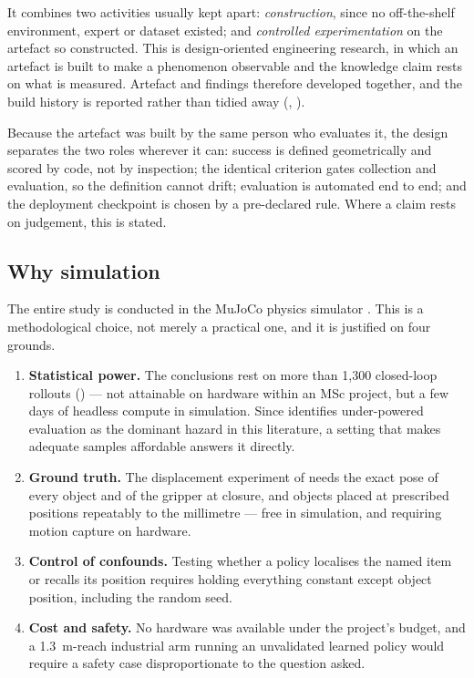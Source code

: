 It combines two activities usually kept apart: \emph{construction}, since no
off-the-shelf environment, expert or dataset existed; and \emph{controlled
experimentation} on the artefact so constructed. This is design-oriented engineering
research, in which an artefact is built to make a phenomenon observable and the
knowledge claim rests on what is measured. Artefact and findings therefore developed
together, and the build history is reported rather than tidied away
(, ).

Because the artefact was built by the same person who evaluates it, the design separates
the two roles wherever it can: success is defined geometrically and scored by code, not
by inspection; the identical criterion gates collection and evaluation, so the
definition cannot drift; evaluation is automated end to end; and the deployment
checkpoint is chosen by a pre-declared rule. Where a claim rests on judgement, this is
stated.

\subsection{Why simulation}
\label{sec:m-whysim}
The entire study is conducted in the MuJoCo physics simulator
\parencite{todorov2012mujoco}. This is a methodological choice, not merely a
practical one, and it is justified on four grounds.

\begin{enumerate}
    \item \textbf{Statistical power.} The conclusions rest on more than 1{,}300
    closed-loop rollouts () --- not attainable on hardware
    within an MSc project, but a few days of headless compute in simulation. Since
     identifies under-powered evaluation as the dominant hazard in
    this literature, a setting that makes adequate samples affordable answers it
    directly.
    \item \textbf{Ground truth.} The displacement experiment of
     needs the exact pose of every object and of the gripper
    at closure, and objects placed at prescribed positions repeatably to the
    millimetre --- free in simulation, and requiring motion capture on hardware.
    \item \textbf{Control of confounds.} Testing whether a policy localises the named
    item or recalls its position requires holding everything constant except object
    position, including the random seed.
    \item \textbf{Cost and safety.} No hardware was available under the project's
    budget, and a \SI{1.3}{m}-reach industrial arm running an unvalidated learned
    policy would require a safety case disproportionate to the question asked.
\end{enumerate}

